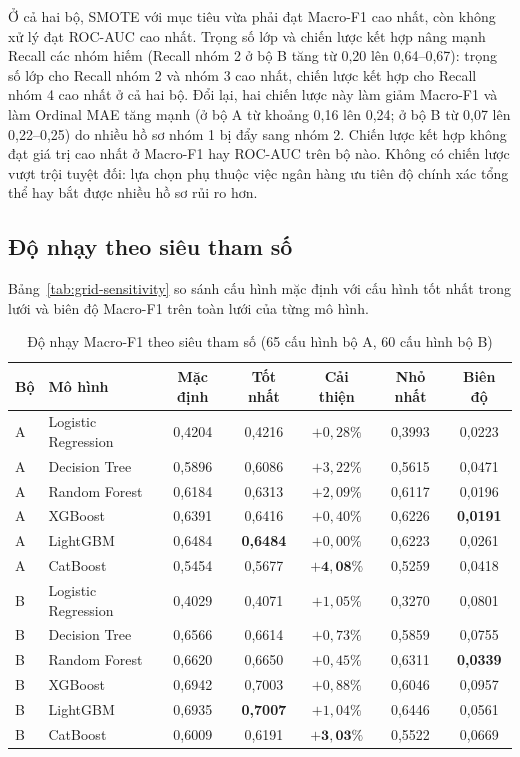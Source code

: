 Ở cả hai bộ, SMOTE với mục tiêu vừa phải đạt Macro-F1 cao nhất, còn không xử lý đạt ROC-AUC cao nhất. Trọng số lớp và chiến lược kết hợp nâng mạnh Recall các nhóm hiếm (Recall nhóm 2 ở bộ B tăng từ 0,20 lên 0,64--0,67): trọng số lớp cho Recall nhóm 2 và nhóm 3 cao nhất, chiến lược kết hợp cho Recall nhóm 4 cao nhất ở cả hai bộ. Đổi lại, hai chiến lược này làm giảm Macro-F1 và làm Ordinal MAE tăng mạnh (ở bộ A từ khoảng 0,16 lên 0,24; ở bộ B từ 0,07 lên 0,22--0,25) do nhiều hồ sơ nhóm 1 bị đẩy sang nhóm 2. Chiến lược kết hợp không đạt giá trị cao nhất ở Macro-F1 hay ROC-AUC trên bộ nào. Không có chiến lược vượt trội tuyệt đối: lựa chọn phụ thuộc việc ngân hàng ưu tiên độ chính xác tổng thể hay bắt được nhiều hồ sơ rủi ro hơn.

\subsection{Độ nhạy theo siêu tham số}
\label{sec:grid-search}

Bảng~\ref{tab:grid-sensitivity} so sánh cấu hình mặc định với cấu hình tốt nhất trong lưới và biên độ Macro-F1 trên toàn lưới của từng mô hình.

\begin{table}[H]
\centering
\caption{Độ nhạy Macro-F1 theo siêu tham số (65 cấu hình bộ A, 60 cấu hình bộ B)}
\label{tab:grid-sensitivity}
\label{tab:grid-best-vs-default}
\begin{tabular}{|l|l|c|c|c|c|c|}
\hline
Bộ & Mô hình & Mặc định & Tốt nhất & Cải thiện & Nhỏ nhất & Biên độ\\
\hline
A & Logistic Regression & 0,4204 & 0,4216 & $+0,28\%$ & 0,3993 & 0,0223\\
A & Decision Tree & 0,5896 & 0,6086 & $+3,22\%$ & 0,5615 & 0,0471\\
A & Random Forest & 0,6184 & 0,6313 & $+2,09\%$ & 0,6117 & 0,0196\\
A & XGBoost & 0,6391 & 0,6416 & $+0,40\%$ & 0,6226 & \textbf{0,0191}\\
A & LightGBM & 0,6484 & \textbf{0,6484} & $+0,00\%$ & 0,6223 & 0,0261\\
A & CatBoost & 0,5454 & 0,5677 & $\mathbf{+4,08\%}$ & 0,5259 & 0,0418\\
\hline
B & Logistic Regression & 0,4029 & 0,4071 & $+1,05\%$ & 0,3270 & 0,0801\\
B & Decision Tree & 0,6566 & 0,6614 & $+0,73\%$ & 0,5859 & 0,0755\\
B & Random Forest & 0,6620 & 0,6650 & $+0,45\%$ & 0,6311 & \textbf{0,0339}\\
B & XGBoost & 0,6942 & 0,7003 & $+0,88\%$ & 0,6046 & 0,0957\\
B & LightGBM & 0,6935 & \textbf{0,7007} & $+1,04\%$ & 0,6446 & 0,0561\\
B & CatBoost & 0,6009 & 0,6191 & $\mathbf{+3,03\%}$ & 0,5522 & 0,0669\\
\hline
\end{tabular}
\end{table}

